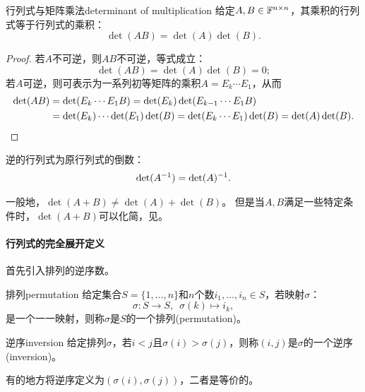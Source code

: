 \begin{theorem}{行列式与矩阵乘法}{determinant of multiplication}
	给定$A,B\in\mathbb F^{n\times n}$，其乘积的行列式等于行列式的乘积：
	\begin{equation}
		\det(AB)=\det(A)\det(B).
	\end{equation}
\end{theorem}
\begin{proof}
	若$A$不可逆，则$AB$不可逆，等式成立：
	\[
		\det(AB)=\det(A)\det(B)=0;
	\]
	若$A$可逆，则可表示为一系列初等矩阵的乘积$A=E_k\cdots E_1$，从而
	\begin{align*}
		\det(AB)&=\det(E_k\cdots E_1B)=\det(E_k)\det(E_{k-1}\cdots E_1B)\\
		&=\det(E_k)\cdots\det(E_1)\det(B)=\det(E_k\cdots E_1)\det(B)=\det(A)\det(B).
		\qedhere
	\end{align*}
\end{proof}
\begin{corollary}
	逆的行列式为原行列式的倒数：
	\begin{align}
		\det(A^{-1})=\det(A)^{-1}.
	\end{align}
\end{corollary}

\begin{remark}
	一般地，$\det(A+B)\neq\det(A)+\det(B)$。
	但是当$A,B$满足一些特定条件时，$\det(A+B)$可以化简，见。
\end{remark}

\paragraph{行列式的完全展开定义}

首先引入排列的逆序数。

\begin{definition}
	{排列}{permutation}
	给定集合$S=\{1,\ldots,n\}$和$n$个数$i_1,\ldots,i_n\in S$，若映射$\sigma$：
	\[
		\sigma:S\to S,\enspace \sigma(k)\mapsto i_k,
	\]
	是一个一一映射，则称$\sigma$是$S$的一个排列(permutation)。
\end{definition}
\begin{definition}
	{逆序}{inversion}
	给定排列$\sigma$，若$i<j$且$\sigma(i)>\sigma(j)$，则称$(i,j)$是$\sigma$的一个逆序(inversion)。
\end{definition}

\begin{remark}
	有的地方将逆序定义为$(\sigma(i),\sigma(j))$，二者是等价的。
\end{remark}

